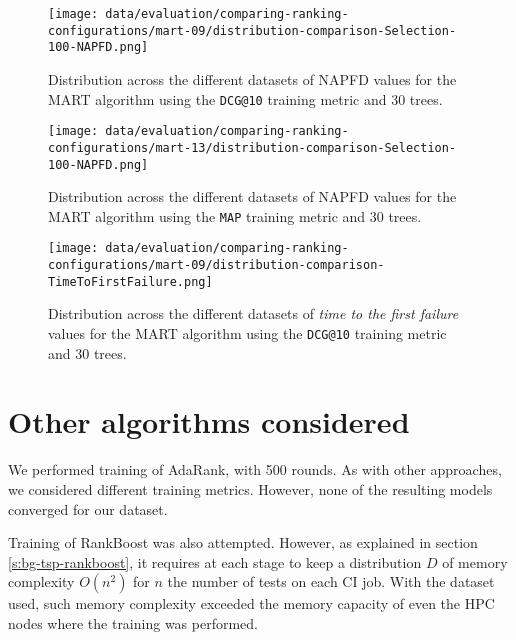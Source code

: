 \begin{figure}
    \centering
    \begin{minipage}{.45\textwidth}
        \centering
        \label{fig:mart-09-napfd}
        \texttt{[image: data/evaluation/comparing-ranking-configurations/mart-09/distribution-comparison-Selection-100-NAPFD.png]}
        \parbox{0.9\textwidth}{\caption{Distribution across the different datasets of NAPFD values for the MART algorithm using the \texttt{DCG@10} training metric and 30 trees.}}
    \end{minipage}%
    \begin{minipage}{.45\textwidth}
        \centering
        \label{fig:mart-13-napfd}
        \texttt{[image: data/evaluation/comparing-ranking-configurations/mart-13/distribution-comparison-Selection-100-NAPFD.png]}
        \parbox{0.9\textwidth}{\caption{Distribution across the different datasets of NAPFD values for the MART algorithm using the \texttt{MAP} training metric and 30 trees.}}
    \end{minipage}%
\end{figure}
\begin{figure}
    \centering
    \begin{minipage}{.45\textwidth}
        \centering
        \label{fig:mart-09-tff}
        \texttt{[image: data/evaluation/comparing-ranking-configurations/mart-09/distribution-comparison-TimeToFirstFailure.png]}
        \parbox{0.9\textwidth}{\caption{Distribution across the different datasets of \emph{time to the first failure} values for the MART algorithm using the \texttt{DCG@10} training metric and 30 trees.}}
    \end{minipage}%
\end{figure}

\section{Other algorithms considered}

We performed training of AdaRank, with 500 rounds. As with other approaches, we considered different training metrics. 
However, none of the resulting models converged for our dataset.

Training of RankBoost was also attempted. However, as explained in section \ref{s:bg-tsp-rankboost},
it requires at each stage to keep a distribution $D$ of memory complexity $O(n^2)$ for $n$ the number of tests
on each CI job. With the dataset used, such memory complexity exceeded the memory capacity of even the HPC nodes 
where the training was performed.